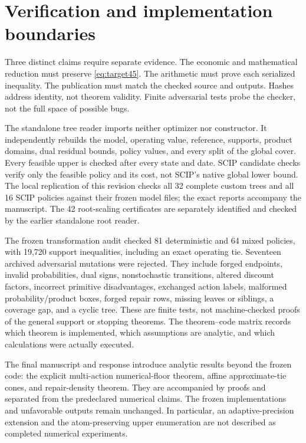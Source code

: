 \section{Verification and implementation boundaries}\label{sec:verification45}
Three distinct claims require separate evidence. The economic and mathematical reduction must preserve \eqref{eq:target45}. The arithmetic must prove each serialized inequality. The publication must match the checked source and outputs. Hashes address identity, not theorem validity. Finite adversarial tests probe the checker, not the full space of possible bugs.

The standalone tree reader imports neither optimizer nor constructor. It independently rebuilds the model, operating value, reference, supports, product domains, dual residual bounds, policy values, and every split of the global cover. Every feasible upper is checked after every state and date. SCIP candidate checks verify only the feasible policy and its cost, not SCIP's native global lower bound. The local replication of this revision checks all 32 complete custom trees and all 16 SCIP policies against their frozen model files; the exact reports accompany the manuscript. The 42 root-scaling certificates are separately identified and checked by the earlier standalone root reader.

The frozen transformation audit checked 81 deterministic and 64 mixed policies, with 19,720 support inequalities, including an exact operating tie. Seventeen archived adversarial mutations were rejected. They include forged endpoints, invalid probabilities, dual signs, nonstochastic transitions, altered discount factors, incorrect primitive disadvantages, exchanged action labels, malformed probability/product boxes, forged repair rows, missing leaves or siblings, a coverage gap, and a cyclic tree. These are finite tests, not machine-checked proofs of the general support or stopping theorems. The theorem--code matrix records which theorem is implemented, which assumptions are analytic, and which calculations were actually executed.

The final manuscript and response introduce analytic results beyond the frozen code: the explicit multi-action numerical-floor theorem, affine approximate-tie cones, and repair-density theorem. They are accompanied by proofs and separated from the predeclared numerical claims. The frozen implementations and unfavorable outputs remain unchanged. In particular, an adaptive-precision extension and the atom-preserving upper enumeration are not described as completed numerical experiments.

